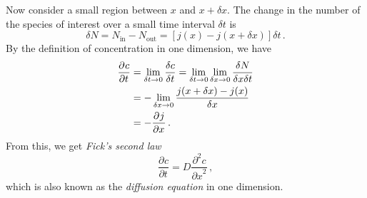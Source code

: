 \documentclass{article}
\theoremstyle{plain}\theoremheaderfont{\normalfont\bfseries}\theorembodyfont{\rmfamily}\theoremseparator{.}\newtheorem*{thm}{Theorem}\newtheorem*{law}{Law}\newtheorem*{pos}{Postulate}
\numberwithin{equation}{section}
\newcommand{\pdv}[3][]{\frac{\partial^{#1} #2}{{\partial #3}^{#1}}}
\begin{document}
    Now consider a small region between \(x\) and \(x+\delta x\). The change in the number of the species of interest over a small time interval \(\delta t\) is
    \begin{equation}
        \delta N=N_{\text{in}}-N_{\text{out}}=[j(x)-j(x+\delta x)]\delta t\,.
    \end{equation}
    By the definition of concentration in one dimension, we have
    \begin{align}
        \pdv{c}{t}&=\lim_{\delta t\to 0}\frac{\delta c}{\delta t}=\lim_{\delta t\to 0}\lim_{\delta x\to 0}\frac{\delta N}{\delta x\delta t}\notag\\
        &=-\lim_{\delta x\to 0}\frac{j(x+\delta x)-j(x)}{\delta x}\notag \\
        &=-\pdv{j}{x}\,.
    \end{align}
    From this, we get \textit{Fick's second law}
    \begin{equation}
        \pdv{c}{t}=D\pdv[2]{c}{x}\,,
    \end{equation}
    which is also known as the \textit{diffusion equation} in one dimension.
\end{document}

